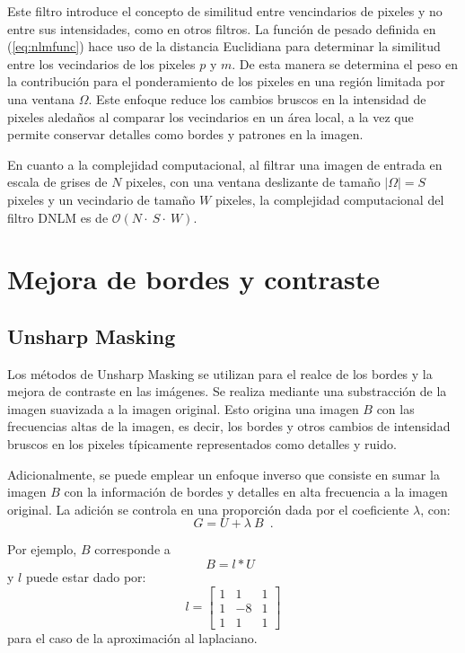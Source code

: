 Este filtro introduce el concepto de similitud entre vencindarios de pixeles y no entre sus intensidades, como en otros filtros. La función de pesado definida en (\ref{eq:nlmfunc}) hace uso de la distancia Euclidiana para determinar la similitud entre los vecindarios de los pixeles $p$ y $m$. 
De esta manera se determina el peso en la contribución para el ponderamiento de los pixeles en una región limitada por una ventana $\Omega$. Este enfoque reduce los cambios bruscos en la intensidad de pixeles aleda\~nos al comparar los vecindarios en un \'area local, a la vez que permite conservar detalles como bordes y patrones en la imagen\cite{calderon2015dewaff}. 


En cuanto a la complejidad computacional, al filtrar una imagen de entrada en escala de grises de $N$ pixeles, con una ventana deslizante de tama\~no $|\Omega| = S$ pixeles y un vecindario de tama\~no $W$ pixeles, la complejidad computacional del filtro DNLM es de $\mathcal{O}(N\cdot~S\cdot~W)$. 



\section{Mejora de bordes y contraste}

\subsection{Unsharp Masking}
\label{ch:marco_usm}

Los métodos de Unsharp Masking se utilizan para el realce de los bordes y la mejora de contraste en las im\'agenes. Se realiza mediante una substracción de la imagen suavizada a la imagen original. Esto origina una imagen $B$ con las frecuencias altas de la imagen, es decir, los bordes y otros cambios de intensidad bruscos en los pixeles típicamente representados como detalles y ruido. 

Adicionalmente, se puede emplear un enfoque inverso que consiste en sumar la imagen $B$ con la información de bordes y detalles en alta frecuencia a la imagen original. La adición se controla en una proporción dada por el coeficiente $\lambda$, con:
%
\begin{equation}
\label{eq:unsharpmask}
G=U+\lambda~B \enspace .
\end{equation}

Por ejemplo, $B$ corresponde a
%
\begin{equation}
\label{eq:unsharfilter}
B=l*U \enspace 
\end{equation}
%
y $l$ puede estar dado por:
%
\begin{equation} l = \left[
\begin{array}{ccc}
1 & 1 & 1\\
1 & -8 & 1\\
1 & 1 & 1
\end{array}\right]
\end{equation}
%
para el caso de la aproximación al laplaciano.

